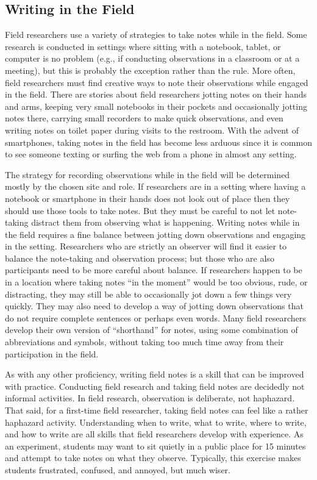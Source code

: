 \subsection{Writing in the Field}

Field researchers use a variety of strategies to take notes while in the field. Some research is conducted in settings where sitting with a notebook, tablet, or computer is no problem (e.g., if conducting observations in a classroom or at a meeting), but this is probably the exception rather than the rule. More often, field researchers must find creative ways to note their observations while engaged in the field. There are stories about field researchers jotting notes on their hands and arms, keeping very small notebooks in their pockets and occasionally jotting notes there, carrying small recorders to make quick observations, and even writing notes on toilet paper during visits to the restroom. With the advent of smartphones, taking notes in the field has become less arduous since it is common to see someone texting or surfing the web from a phone in almost any setting.

The strategy for recording observations while in the field will be determined mostly by the chosen site and role. If researchers are in a setting where having a notebook or smartphone in their hands does not look out of place then they should use those tools to take notes. But they must be careful to not let note-taking distract them from observing what is happening. Writing notes while in the field requires a fine balance between jotting down observations and engaging in the setting. Researchers who are strictly an observer will find it easier to balance the note-taking and observation process; but those who are also participants need to be more careful about balance. If researchers happen to be in a location where taking notes ``in the moment'' would be too obvious, rude, or distracting, they may still be able to occasionally jot down a few things very quickly. They may also need to develop a way of jotting down observations that do not require complete sentences or perhaps even words. Many field researchers develop their own version of ``shorthand'' for notes, using some combination of abbreviations and symbols, without taking too much time away from their participation in the field.

As with any other proficiency, writing field notes is a skill that can be improved with practice. Conducting field research and taking field notes are decidedly not informal activities. In field research, observation is deliberate, not haphazard. That said, for a first-time field researcher, taking field notes can feel like a rather haphazard activity. Understanding when to write, what to write, where to write, and how to write are all skills that field researchers develop with experience. As an experiment, students may want to sit quietly in a public place for 15 minutes and attempt to take notes on what they observe. Typically, this exercise makes students frustrated, confused, and annoyed, but much wiser.

